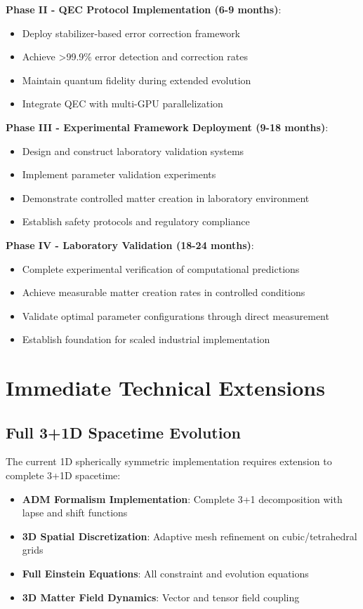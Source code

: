 \documentclass[11pt]{article}
\begin{document}
\textbf{Phase II - QEC Protocol Implementation (6-9 months)}:
\begin{itemize}
\item Deploy stabilizer-based error correction framework
\item Achieve >99.9\% error detection and correction rates
\item Maintain quantum fidelity during extended evolution
\item Integrate QEC with multi-GPU parallelization
\end{itemize}

\textbf{Phase III - Experimental Framework Deployment (9-18 months)}:
\begin{itemize}
\item Design and construct laboratory validation systems
\item Implement parameter validation experiments
\item Demonstrate controlled matter creation in laboratory environment
\item Establish safety protocols and regulatory compliance
\end{itemize}

\textbf{Phase IV - Laboratory Validation (18-24 months)}:
\begin{itemize}
\item Complete experimental verification of computational predictions
\item Achieve measurable matter creation rates in controlled conditions
\item Validate optimal parameter configurations through direct measurement
\item Establish foundation for scaled industrial implementation
\end{itemize}

\section{Immediate Technical Extensions}

\subsection{Full 3+1D Spacetime Evolution}

The current 1D spherically symmetric implementation requires extension to complete 3+1D spacetime:

\begin{itemize}
\item \textbf{ADM Formalism Implementation}: Complete 3+1 decomposition with lapse and shift functions
\item \textbf{3D Spatial Discretization}: Adaptive mesh refinement on cubic/tetrahedral grids
\item \textbf{Full Einstein Equations}: All constraint and evolution equations
\item \textbf{3D Matter Field Dynamics}: Vector and tensor field coupling
\end{itemize}
\end{document}
